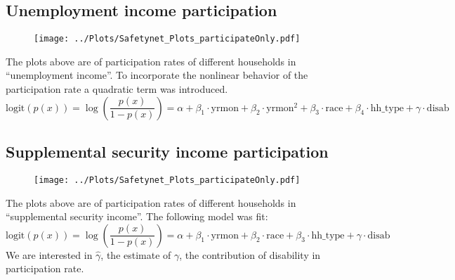 \documentclass[11pt]{extarticle} %
\begin{document}
\subsection{Unemployment income participation}
\begin{figure}[H]
\begin{center}
\texttt{[image: ../Plots/Safetynet\_Plots\_participateOnly.pdf]}
\end{center}
\end{figure}
The plots above are of participation rates of different households in ``unemployment income''. To incorporate the nonlinear behavior of the participation rate a quadratic term was introduced.
\[ \text{logit}(p(x)) = \log\left(\frac{p(x)}{1 - p(x)}\right) = \alpha + \beta_1\cdot \text{yrmon} + \beta_2 \cdot \text{yrmon}^2 + \beta_3 \cdot \text{race} + \beta_4 \cdot \text{hh\_type} + \gamma \cdot \text{disab} \]


\subsection{Supplemental security income participation}
\begin{figure}[H]
\begin{center}
\texttt{[image: ../Plots/Safetynet\_Plots\_participateOnly.pdf]}
\end{center}
\end{figure}
The plots above are of participation rates of different households in ``supplemental security income''. The following model was fit:
\[ \text{logit}(p(x)) = \log\left(\frac{p(x)}{1 - p(x)}\right) = \alpha + \beta_1\cdot \text{yrmon} + \beta_2 \cdot \text{race} + \beta_3 \cdot \text{hh\_type} + \gamma \cdot \text{disab} \]
We are interested in $\hat{\gamma}$, the estimate of $\gamma$, the contribution of disability in participation rate. 
\end{document}
